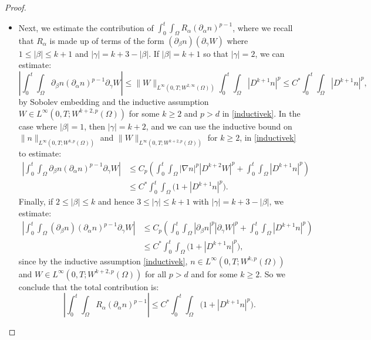 \documentclass[10pt,a4paper]{amsart}
\begin{document}
\begin{proof}
\begin{itemize}
\item Next, we estimate the contribution of $\displaystyle \int_{0}^{t} \int_{\Omega} R_{\alpha} (\partial_{\alpha}n)^{p - 1}$, where we recall that $R_{\alpha}$ is made up of terms of the form $(\partial_{\beta} n)(\partial_{\gamma} W)$ where $1 \le |\beta| \le k + 1$ and $|\gamma| = k + 3 - |\beta|$. If $|\beta| = k + 1$ so that $|\gamma| = 2$, we can estimate:
\begin{equation*}
\left|\int_{0}^{t} \int_{\Omega} \partial_{\beta} n (\partial_{\alpha}n)^{p - 1} \partial_{\gamma} W\right| \le \|W\|_{L^{\infty}(0, T; W^{2, \infty}(\Omega))} \int_{0}^{t} \int_{\Omega} |D^{k + 1}n|^{p} \le C^{*} \int_{0}^{t} \int_{\Omega} |D^{k + 1}n|^{p},
\end{equation*}
by Sobolev embedding and the inductive assumption $W \in L^{\infty}(0, T; W^{k + 2, p}(\Omega))$ for some $k \ge 2$ and $p > d$ in \eqref{inductivek}. In the case where $|\beta| = 1$, then $|\gamma| = k + 2$, and we can use the inductive bound on $\|n\|_{L^{\infty}(0, T; W^{k, p}(\Omega))}$ and $\|W\|_{L^{\infty}(0, T; W^{k + 2, p}(\Omega))}$ for $k \ge 2$, in \eqref{inductivek} to estimate:
\begin{align*}
\left|\int_{0}^{t} \int_{\Omega} \partial_{\beta} n (\partial_{\alpha} n)^{p - 1}\partial_{\gamma} W\right| &\le C_{p}\left(\int_{0}^{t} \int_{\Omega} |\nabla n|^{p} |D^{k + 2}W|^{p} + \int_{0}^{t} \int_{\Omega} |D^{k + 1}n|^{p}\right) \\
&\le C^{*} \int_{0}^{t} \int_{\Omega} \Big(1 + |D^{k + 1}n|^{p}\Big). 
\end{align*}
Finally, if $2 \le |\beta| \le k$ and hence $3 \le |\gamma| \le k + 1$ with $|\gamma| = k + 3 - |\beta|$, we estimate:
\begin{align*}
\left|\int_{0}^{t} \int_{\Omega} (\partial_{\beta} n)(\partial_{\alpha}n)^{p - 1} \partial_{\gamma} W\right| &\le C_p\left(\int_{0}^{t} \int_{\Omega} |\partial_{\beta}n|^{p} |\partial_{\gamma} W|^{p} + \int_{0}^{t} \int_{\Omega} |D^{k + 1}n|^{p}\right) \\
&\le C^{*}\int_{0}^{t} \int_{\Omega} \Big(1 + |D^{k + 1}n|^{p}\Big),
\end{align*}
since by the inductive assumption \eqref{inductivek}, $n \in L^{\infty}(0, T; W^{k, p}(\Omega))$ and $W \in L^{\infty}(0, T; W^{k + 2, p}(\Omega))$ for all $p > d$ and for some $k \ge 2$. So we conclude that the total contribution is:
\begin{equation*}
\left|\int_{0}^{t} \int_{\Omega} R_{\alpha} (\partial_{\alpha} n)^{p - 1}\right| \le C^{*} \int_{0}^{t} \int_{\Omega} \Big(1 + |D^{k + 1}n|^{p}\Big).

\end{equation*}
\end{itemize}
\end{proof}
\end{document}
